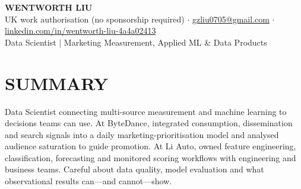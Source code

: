 \documentclass[a4paper,10pt]{article}
\begin{document}
\fontsize{9.8pt}{11.2pt}\selectfont

\begin{center}
{\Large\bfseries WENTWORTH LIU}\\[2pt]
{\small UK work authorisation (no sponsorship required) \;$\cdot$\; \href{mailto:gzliu0705@gmail.com}{gzliu0705@gmail.com} \;$\cdot$\; \href{https://www.linkedin.com/in/wentworth-liu-4a4a02413}{linkedin.com/in/wentworth-liu-4a4a02413}}\\[2pt]
{\small Data Scientist \;$\vert$\; Marketing Measurement, Applied ML \& Data Products}
\end{center}
\vspace{-4pt}

\section{SUMMARY}
Data Scientist connecting multi-source measurement and machine learning to decisions teams can use. At ByteDance, integrated consumption, dissemination and search signals into a daily marketing-prioritisation model and analysed audience saturation to guide promotion. At Li Auto, owned feature engineering, classification, forecasting and monitored scoring workflows with engineering and business teams. Careful about data quality, model evaluation and what observational results can---and cannot---show.
\end{document}
